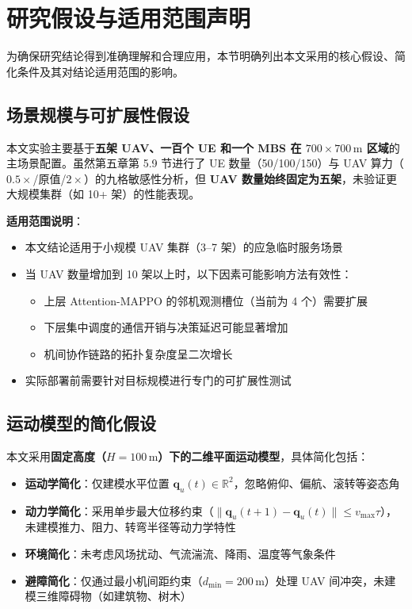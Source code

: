 \section{研究假设与适用范围声明}
\label{sec:assumptions-and-scope}

为确保研究结论得到准确理解和合理应用，本节明确列出本文采用的核心假设、简化条件及其对结论适用范围的影响。

\subsection{场景规模与可扩展性假设}
\label{sec:scale-assumptions}

本文实验主要基于\textbf{五架 UAV、一百个 UE 和一个 MBS 在 $700\times700\,\mathrm{m}$ 区域}的主场景配置。虽然第五章第 5.9 节进行了 UE 数量（50/100/150）与 UAV 算力（$0.5\times$/原值/$2\times$）的九格敏感性分析，但 \textbf{UAV 数量始终固定为五架}，未验证更大规模集群（如 10+ 架）的性能表现。

\textbf{适用范围说明}：
\begin{itemize}
    \item 本文结论适用于小规模 UAV 集群（3--7 架）的应急临时服务场景
    \item 当 UAV 数量增加到 10 架以上时，以下因素可能影响方法有效性：
    \begin{itemize}
        \item 上层 Attention-MAPPO 的邻机观测槽位（当前为 4 个）需要扩展
        \item 下层集中调度的通信开销与决策延迟可能显著增加
        \item 机间协作链路的拓扑复杂度呈二次增长
    \end{itemize}
    \item 实际部署前需要针对目标规模进行专门的可扩展性测试
\end{itemize}

\subsection{运动模型的简化假设}
\label{sec:motion-assumptions}

本文采用\textbf{固定高度（$H=100\,\mathrm{m}$）下的二维平面运动模型}，具体简化包括：
\begin{itemize}
    \item \textbf{运动学简化}：仅建模水平位置 $\mathbf{q}_u(t)\in\mathbb{R}^2$，忽略俯仰、偏航、滚转等姿态角
    \item \textbf{动力学简化}：采用单步最大位移约束（$\|\mathbf{q}_u(t+1)-\mathbf{q}_u(t)\|\leq v_{\max}\tau$），未建模推力、阻力、转弯半径等动力学特性
    \item \textbf{环境简化}：未考虑风场扰动、气流湍流、降雨、温度等气象条件
    \item \textbf{避障简化}：仅通过最小机间距约束（$d_{\min}=200\,\mathrm{m}$）处理 UAV 间冲突，未建模三维障碍物（如建筑物、树木）
\end{itemize}

